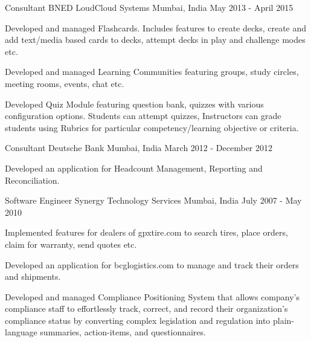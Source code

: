 \begin{cventries}
  \cventry
    {Consultant} %
    {BNED LoudCloud Systems} %
    {Mumbai, India} %
    {May 2013 - April 2015} %
    {
      \begin{cvitems} %
        \item {Developed and managed Flashcards. Includes features to create decks, create and add text/media based cards to decks, attempt decks in play and challenge modes etc.}
        \item {Developed and managed Learning Communities featuring groups, study circles, meeting rooms, events, chat etc.}
        \item {Developed Quiz Module featuring question bank, quizzes with various configuration options. Students can attempt quizzes, Instructors can grade students using Rubrics for particular competency/learning objective or criteria.}
      \end{cvitems}
    }

  \cventry
    {Consultant} %
    {Deutsche Bank} %
    {Mumbai, India} %
    {March 2012 - December 2012} %
    {
      \begin{cvitems} %
        \item {Developed an application for Headcount Management, Reporting and Reconciliation.}
      \end{cvitems}
    }

  \cventry
    {Software Engineer} %
    {Synergy Technology Services} %
    {Mumbai, India} %
    {July 2007 - May 2010} %
    {
      \begin{cvitems} %
        \item {Implemented features for dealers of gpxtire.com to search tires, place orders, claim for warranty, send quotes etc.}
        \item {Developed an application for bcglogistics.com to manage and track their orders and shipments.}
        \item {Developed and managed Compliance Positioning System that allows company’s compliance staff to effortlessly track, correct, and record their organization’s compliance status by converting complex legislation and regulation into plain-language summaries, action-items, and questionnaires.}
      \end{cvitems}
    }


\end{cventries}
